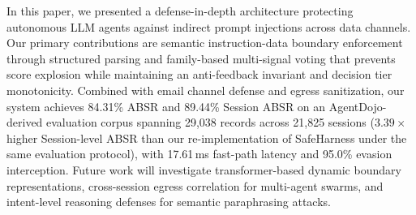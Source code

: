 \documentclass[runningheads]{llncs}
\begin{document}
In this paper, we presented a defense-in-depth architecture protecting autonomous LLM agents against indirect prompt injections across data channels. Our primary contributions are semantic instruction-data boundary enforcement through structured parsing and family-based multi-signal voting that prevents score explosion while maintaining an anti-feedback invariant and decision tier monotonicity. Combined with email channel defense and egress sanitization, our system achieves 84.31\% ABSR and 89.44\% Session ABSR on an AgentDojo-derived evaluation corpus spanning 29,038 records across 21,825 sessions ($3.39\times$ higher Session-level ABSR than our re-implementation of SafeHarness under the same evaluation protocol), with 17.61\,ms fast-path latency and 95.0\% evasion interception. Future work will investigate transformer-based dynamic boundary representations, cross-session egress correlation for multi-agent swarms, and intent-level reasoning defenses for semantic paraphrasing attacks.



\end{document}
